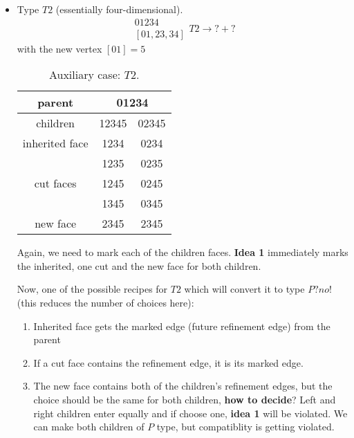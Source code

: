 \documentclass[a4paper,12pt]{amsart}
\numberwithin{equation}{section}
\begin{document}
\begin{itemize}
	\item Type $T2$ (essentially four-dimensional).
	$$ \begin{array}{c} 01234 \\ \left[01,23,34\right] \end{array} T2
	\rightarrow ? + ? $$
	with the new vertex $\left[01\right] = 5$
	\begin{table}[h!]
	\caption{Auxiliary case: $T2$.}
	\label{tab:Case4}
	\begin{tabular}{|c|c|c|} \hline
	parent & \multicolumn{2}{|c|}{01234} \\ \hline
	children & 12345 & 02345 \\ \hline
	inherited face & 1234 & 0234 \\ \hline
	\multirow{3}{*}{cut faces} & 1235 & 0235 \\ 
	 & 1245 & 0245 \\ 
	 & 1345 & 0345 \\ \hline
	 new face & 2345 & 2345 \\ \hline
	\end{tabular}
	\end{table}    
    Again, we need to mark each of the children faces. 
    \textbf{Idea 1} immediately marks the inherited, one cut and the new face for both children. 
    
    Now, one of the possible recipes for $T2$ which will convert it to type $P? no!$ (this reduces the number of choices here):
    	\begin{enumerate}
		\item Inherited face gets the marked edge (future refinement edge) from the parent
		\item If a cut face contains the refinement edge, it is its marked edge.
		\item The new face contains both of the children's refinement edges, but the choice should be the same for both children, \textbf{how to decide}? Left and right children enter equally and if choose one, \textbf{idea 1} will be violated. We can make both children of $P$ type, but compatiblity is getting violated.
	\end{enumerate}	

	  \begin{minipage}[]{0.4\textwidth}
	  \begin{center}
\end{center}
\end{minipage}
\end{itemize}
\end{document}
